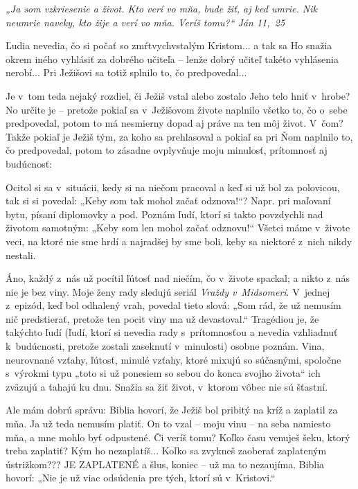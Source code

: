 


{\it „Ja som vzkriesenie a život. Kto verí vo mňa, bude žiť, aj keď umrie. Nik neumrie naveky, kto žije a verí vo mňa. Veríš tomu?“ Ján 11,~25}

Ľudia nevedia, čo si počať so zmŕtvychvstalým Kristom... a tak sa Ho snažia okrem iného vyhlásiť za dobrého učiteľa -- lenže dobrý učiteľ takéto vyhlásenia nerobí...
Pri Ježišovi sa totiž splnilo to, čo predpovedal...

Je v~tom teda nejaký rozdiel,  či Ježiš vstal alebo zostalo Jeho telo hniť v~hrobe? No určite je -- pretože pokiaľ sa v~Ježišovom živote naplnilo všetko to, čo o~sebe predpovedal,  potom to má nesmierny dopad aj práve na ten môj život. V~čom? Takže pokiaľ je Ježiš tým, za koho sa prehlasoval a pokiaľ sa pri Ňom naplnilo to, čo predpovedal, potom to zásadne ovplyvňuje moju minulosť, prítomnosť aj budúcnosť:


Ocitol si sa v~situácii, kedy si na niečom pracoval a keď si už bol za polovicou, tak si si povedal: „Keby som tak mohol začať odznova!“? Napr. pri maľovaní bytu, písaní diplomovky a pod. Poznám ľudí, ktorí si takto povzdychli nad životom samotným: „Keby som len mohol začať odznovu!“ Všetci máme v~živote veci, na ktoré nie sme hrdí a najradšej by sme boli, keby sa niektoré z~nich nikdy nestali.

Áno, každý z~nás už pocítil ľútosť nad niečím, čo v~živote spackal; a nikto z~nás nie je bez viny. Moje ženy rady sledujú seriál {\it Vraždy v~Midsomeri}. V~jednej z~epizód, keď bol odhalený vrah, povedal tieto slová: „Som rád, že už nemusím nič predstierať, pretože ten pocit viny ma už devastoval.“ Tragédiou je, že takýchto ľudí (ľudí, ktorí si nevedia rady s~prítomnosťou a nevedia vzhliadnuť k~budúcnosti, pretože zostali zaseknutí v~minulosti) osobne poznám. Vina, neurovnané vzťahy, ľútosť, minulé vzťahy, ktoré mixujú so súčasnými, spoločne s~výrokmi typu „toto si už ponesiem so sebou do konca svojho života“ ich zväzujú a ťahajú ku dnu. Snažia sa žiť život, v~ktorom vôbec nie sú šťastní.

Ale mám dobrú správu: Biblia hovorí, že Ježiš bol pribitý na kríž a zaplatil za mňa. Ja už teda nemusím platiť. On to vzal -- moju vinu -- na seba namiesto mňa, a mne mohlo byť odpustené. Či veríš tomu? Koľko času venuješ šeku, ktorý treba zaplatiť? Kým ho nezaplatíš... Koľko sa zvykneš zaoberať zaplateným ústrižkom??? JE ZAPLATENÉ a šlus, koniec -- už ma to nezaujíma. Biblia hovorí: „Nie je už viac odsúdenia pre tých, ktorí sú v~Kristovi.“

